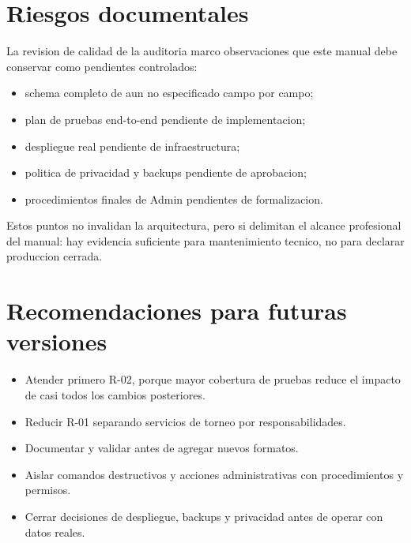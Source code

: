 \section{Riesgos documentales}
\label{sec:riesgos-documentales}

La revision de calidad de la auditoria marco observaciones que este manual debe conservar como pendientes controlados:

\begin{itemize}
  \item schema completo de  aun no especificado campo por campo;
  \item plan de pruebas end-to-end pendiente de implementacion;
  \item despliegue real pendiente de infraestructura;
  \item politica de privacidad y backups pendiente de aprobacion;
  \item procedimientos finales de Admin pendientes de formalizacion.
\end{itemize}

Estos puntos no invalidan la arquitectura, pero si delimitan el alcance profesional del manual: hay evidencia suficiente para mantenimiento tecnico, no para declarar produccion cerrada.

\section{Recomendaciones para futuras versiones}
\label{sec:riesgos-recomendaciones}

\begin{itemize}
  \item Atender primero R-02, porque mayor cobertura de pruebas reduce el impacto de casi todos los cambios posteriores.
  \item Reducir R-01 separando servicios de torneo por responsabilidades.
  \item Documentar y validar  antes de agregar nuevos formatos.
  \item Aislar comandos destructivos y acciones administrativas con procedimientos y permisos.
  \item Cerrar decisiones de despliegue, backups y privacidad antes de operar con datos reales.
\end{itemize}
